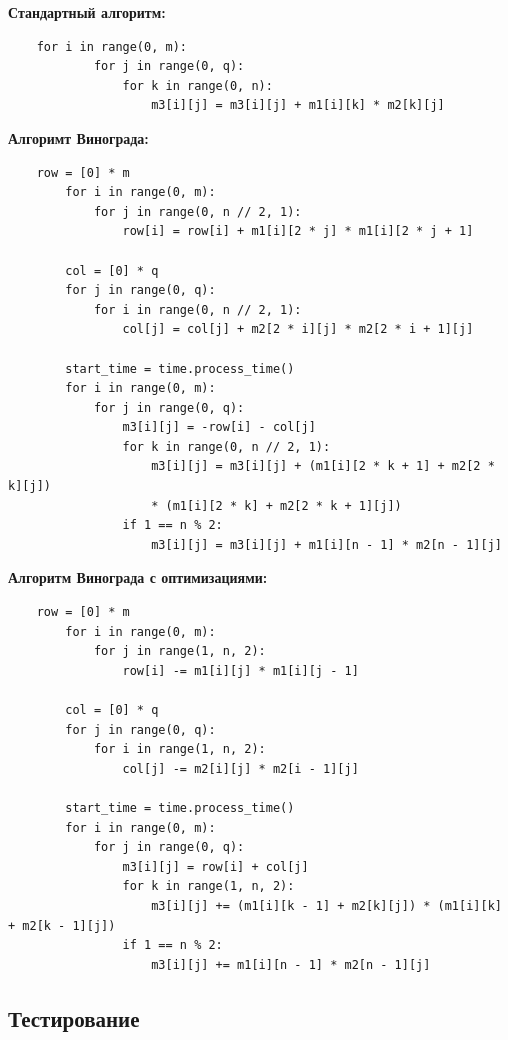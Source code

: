 \documentclass[a4paper,14pt]{article} %
\begin{document}
        	\textbf{Стандартный алгоритм:}
        
	\begin{lstlisting}
	for i in range(0, m):
            for j in range(0, q):
                for k in range(0, n):
                    m3[i][j] = m3[i][j] + m1[i][k] * m2[k][j]
	\end{lstlisting}

	\textbf{Алгоримт Винограда: }
	\begin{lstlisting}
	row = [0] * m
        for i in range(0, m):
            for j in range(0, n // 2, 1):
                row[i] = row[i] + m1[i][2 * j] * m1[i][2 * j + 1]

        col = [0] * q
        for j in range(0, q):
            for i in range(0, n // 2, 1):
                col[j] = col[j] + m2[2 * i][j] * m2[2 * i + 1][j]

        start_time = time.process_time()
        for i in range(0, m):
            for j in range(0, q):
                m3[i][j] = -row[i] - col[j]
                for k in range(0, n // 2, 1):
                    m3[i][j] = m3[i][j] + (m1[i][2 * k + 1] + m2[2 * k][j]) 
                    * (m1[i][2 * k] + m2[2 * k + 1][j])
                if 1 == n % 2:
                    m3[i][j] = m3[i][j] + m1[i][n - 1] * m2[n - 1][j]
	\end{lstlisting}

	\textbf{Алгоритм Винограда с оптимизациями: }
	\begin{lstlisting}
	row = [0] * m
        for i in range(0, m):
            for j in range(1, n, 2):
                row[i] -= m1[i][j] * m1[i][j - 1]

        col = [0] * q
        for j in range(0, q):
            for i in range(1, n, 2):
                col[j] -= m2[i][j] * m2[i - 1][j]

        start_time = time.process_time()
        for i in range(0, m):
            for j in range(0, q):
                m3[i][j] = row[i] + col[j]
                for k in range(1, n, 2):
                    m3[i][j] += (m1[i][k - 1] + m2[k][j]) * (m1[i][k] + m2[k - 1][j])
                if 1 == n % 2:
                    m3[i][j] += m1[i][n - 1] * m2[n - 1][j]
	\end{lstlisting}
        
	\subsection{Тестирование}
	\hfill
	
\end{document}
